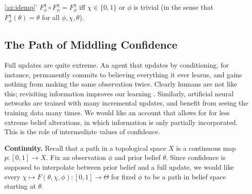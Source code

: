 \begin{CFaxioms}
	\item[\ref*{ax:idemp}']
	$F^\chi_\phi \circ F^\chi_\phi = F^\chi_\phi$ iff $\chi \in \{0,1\}$
		or $\phi$ is trivial (in the sense that $F^\chi_\phi(\theta) = \theta$ for all $\phi,\chi,\theta$).
	\label{ax:idemp-strong}
\end{CFaxioms}




\subsection{%
 	The Path of Middling Confidence}

Full updates are quite extreme.
An agent that updates by conditioning, for instance,
permanently commits to believing everything it ever learns,
and gains nothing from making the same observation twice.
Clearly humans are not like this; revisiting information
 	improves our learning \parencite{ausubel1965effect}.
Similarly, artificial neural networks are trained with
 	many incremental updates, and benefit from seeing 
	the training data many times.
We would like an account that allows for for less extreme belief alterations,
in which information is only partially incorporated.
This is the role of intermediate values of confidence.

\textbf{Continuity.}
Recall that a path in a topological space $X$ is a continuous map $p : [0,1] \to X$. 
Fix an observation $\phi$ and prior belief $\theta$. 
Since confidence is supposed to interpolate
between prior belief and a full update,
we would like every $\chi \mapsto F(\theta,\chi,\phi) : [0,1] \to \Theta$
for fixed $\phi$ to be a path
in belief space starting at $\theta$.

